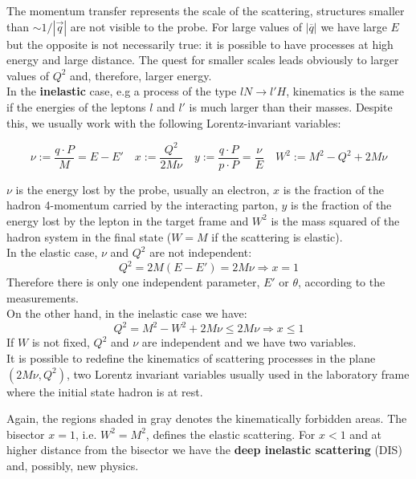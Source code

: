 \documentclass[10.75pt,a4paper,openright,bottom=2cm]{article}
\begin{document}
The momentum transfer represents the scale of the scattering, structures smaller than $\sim1/|\Vec{q}|$ are not visible to the probe. For large values of $|\overline{q}|$ we have large $E$ but the opposite is not necessarily true: it is possible to have processes at high energy and large distance. The quest for smaller scales leads obviously to larger values of $Q^2$ and, therefore, larger energy.\\
In the \textbf{inelastic} case, e.g a process of the type $lN\to l'H$, kinematics is the same if the energies of the leptons $l$ and $l'$ is much larger than their masses. Despite this, we usually work with the following Lorentz-invariant variables:
\begin{tcolorbox}[width=\textwidth,colback={yellow!50},title={Lorentz-Invariant Variables},colbacktitle={gray!50},coltitle=black]
\[
\nu:=\frac{q\cdot P}{M}=E-E' \quad x:=\frac{Q^2}{2M\nu} \quad y:=\frac{q\cdot P}{p\cdot P}=\frac{\nu}{E} \quad W^2:=M^2-Q^2+2M\nu
\]
\end{tcolorbox}
\noindent
$\nu$ is the energy lost by the probe, usually an electron, $x$ is the fraction of the hadron 4-momentum carried by the interacting parton, $y$ is the fraction of the energy lost by the lepton in the target frame and $W^2$ is the mass squared of the hadron system in the final state ($W=M$ if the scattering is elastic).\\
In the elastic case, $\nu$ and $Q^2$ are not independent:
\[
Q^2=2M(E-E')=2M\nu\Rightarrow x=1
\]
Therefore there is only one independent parameter, $E'$ or $\theta$, according to the measurements.\\
On the other hand, in the inelastic case we have:
\[
Q^2=M^2-W^2+2M\nu\le2M\nu\Rightarrow x\le1
\]
If $W$ is not fixed, $Q^2$ and $\nu$ are independent and we have two variables.\\
It is possible to redefine the kinematics of scattering processes in the plane $(2M\nu,Q^2)$, two Lorentz invariant variables usually used in the laboratory frame where the initial state hadron is at rest.\\
\begin{center}
\end{center}
Again, the regions shaded in gray denotes the kinematically forbidden areas. The bisector $x=1$, i.e. $W^2=M^2$, defines the elastic scattering. For $x<1$ and at higher distance from the bisector we have the \textbf{deep inelastic scattering} (DIS) and, possibly, new physics.
\end{document}
